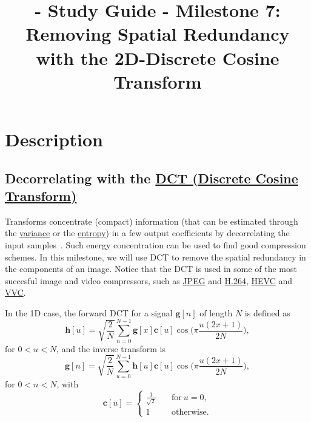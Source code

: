 
\title{\SM{} - Study Guide - Milestone 7: Removing Spatial Redundancy with the 2D-Discrete Cosine Transform}

\maketitle

\tableofcontents

\section{Description}

\subsection{Decorrelating with the \href{https://en.wikipedia.org/wiki/Discrete_cosine_transform}{DCT
(Discrete Cosine Transform)}}

Transforms concentrate (compact) information (that can be estimated
through the \href{https://en.wikipedia.org/wiki/Variance}{variance} or
the \href{https://en.wikipedia.org/wiki/Entropy}{entropy}) in a few
output coefficients by decorrelating the input
samples~\cite{sayood2017introduction}. Such energy concentration can
be used to find good compression schemes. In this milestone, we will
use DCT to remove the spatial redundancy in the components of an
image. Notice that the DCT is used in some of the most succesful image and
video compressors, such as
\href{https://en.wikipedia.org/wiki/JPEG}{JPEG} and
\href{https://en.wikipedia.org/wiki/Advanced_Video_Coding}{H.264},
\href{https://en.wikipedia.org/wiki/Advanced_Video_Coding}{HEVC} and
\href{https://en.wikipedia.org/wiki/Versatile_Video_Coding}{VVC}.

In the 1D case, the forward DCT for a signal $\mathbf{g}[n]$ of
length $N$ is defined as~\cite{burger2016digital}
\begin{equation}
  {\mathbf h}[u] = \sqrt{\frac{2}{N}}\sum_{n=0}^{N-1}{\mathbf
    g}[x]{\mathbf c}[u]\cos\Big(\pi\frac{u(2x+1)}{2N}\Big),
\end{equation}
for $0<u<N$, and the inverse transform is
\begin{equation}
  {\mathbf g}[n] = \sqrt{\frac{2}{N}}\sum_{u=0}^{N-1}{\mathbf
    h}[u]{\mathbf c}[u]\cos\Big(\pi\frac{u(2x+1)}{2N}\Big),
\end{equation}
for $0<n<N$, with
\begin{equation}
  {\mathbf c}[u] = \left\{
  \begin{array}{ll}
    \frac{1}{\sqrt{2}} & \quad \text{for}~u=0, \\
    1 & \quad \text{otherwise}.
  \end{array}
  \right.
\end{equation}

